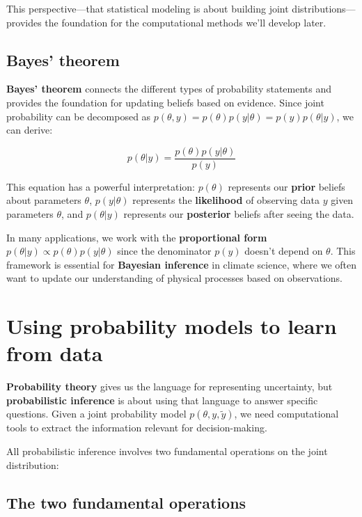 \documentclass[
  letterpaper,
  DIV=11,
  numbers=noendperiod]{scrreprt}
\begin{document}
This perspective---that statistical modeling is about building joint
distributions---provides the foundation for the computational methods
we'll develop later.

\subsection{Bayes' theorem}\label{bayes-theorem}

\textbf{Bayes' theorem} connects the different types of probability
statements and provides the foundation for updating beliefs based on
evidence. Since joint probability can be decomposed as
\(p(\theta, y) = p(\theta) p(y | \theta) = p(y) p(\theta | y)\), we can
derive:

\[
p(\theta | y) = \frac{p(\theta) p(y | \theta)}{p(y)}
\]

This equation has a powerful interpretation: \(p(\theta)\) represents
our \textbf{prior} beliefs about parameters \(\theta\),
\(p(y | \theta)\) represents the \textbf{likelihood} of observing data
\(y\) given parameters \(\theta\), and \(p(\theta | y)\) represents our
\textbf{posterior} beliefs after seeing the data.

In many applications, we work with the \textbf{proportional form}
\(p(\theta | y) \propto p(\theta) p(y | \theta)\) since the denominator
\(p(y)\) doesn't depend on \(\theta\). This framework is essential for
\textbf{Bayesian inference} in climate science, where we often want to
update our understanding of physical processes based on observations.

\section{Using probability models to learn from
data}\label{using-probability-models-to-learn-from-data}

\textbf{Probability theory} gives us the language for representing
uncertainty, but \textbf{probabilistic inference} is about using that
language to answer specific questions. Given a joint probability model
\(p(\theta, y, \tilde{y})\), we need computational tools to extract the
information relevant for decision-making.

All probabilistic inference involves two fundamental operations on the
joint distribution:

\subsection{The two fundamental
operations}\label{the-two-fundamental-operations}
\end{document}
